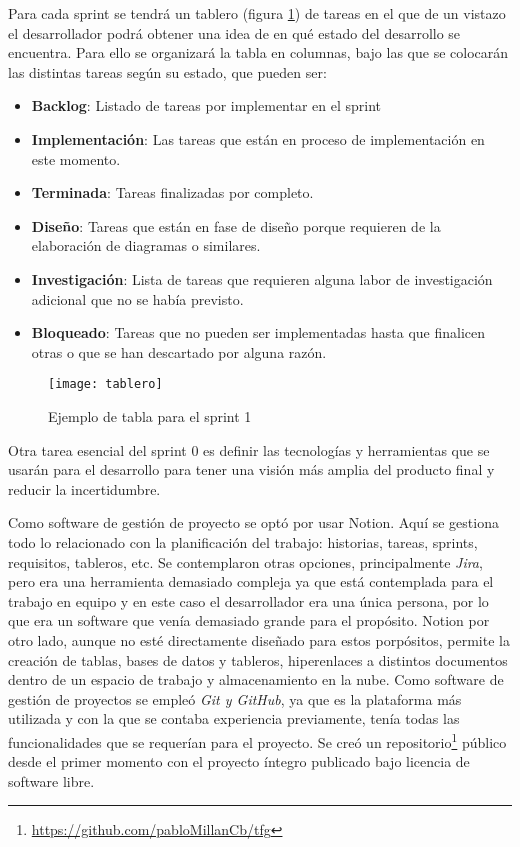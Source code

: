 Para cada sprint se tendrá un tablero (figura \ref{fig:tablero}) de tareas en el que de un vistazo el desarrollador podrá obtener una idea de en qué estado del desarrollo se encuentra. Para ello se organizará la tabla en columnas, bajo las que se colocarán las distintas tareas según su estado, que pueden ser:

\begin{itemize}
    \item \textbf{Backlog}: Listado de tareas por implementar en el sprint
    \item \textbf{Implementación}: Las tareas que están en proceso de implementación en este momento.
    \item \textbf{Terminada}: Tareas finalizadas por completo.
    \item \textbf{Diseño}: Tareas que están en fase de diseño porque requieren de la elaboración de diagramas o similares.
    \item \textbf{Investigación}: Lista de tareas que requieren alguna labor de investigación adicional que no se había previsto.
    \item \textbf{Bloqueado}: Tareas que no pueden ser implementadas hasta que finalicen otras o que se han descartado por alguna razón.
\end{itemize}

\begin{figure}[h]
    \centering
    \texttt{[image: tablero]}
    \caption[Tabla de sprint]{Ejemplo de tabla para el sprint 1}
	\label{fig:tablero}
\end{figure}

Otra tarea esencial del sprint 0 es definir las tecnologías y herramientas que se usarán para el desarrollo para tener una visión más amplia del producto final y reducir la incertidumbre.

Como software de gestión de proyecto se optó por usar Notion\cite{notion}. Aquí se gestiona todo lo relacionado con la planificación del trabajo: historias, tareas, sprints, requisitos, tableros, etc. Se contemplaron otras opciones, principalmente \textit{Jira}\cite{jira}, pero era una herramienta demasiado compleja ya que está contemplada para el trabajo en equipo y en este caso el desarrollador era una única persona, por lo que era un software que venía demasiado grande para el propósito. Notion por otro lado, aunque no esté directamente diseñado para estos porpósitos, permite la creación de tablas, bases de datos y tableros, hiperenlaces a distintos documentos dentro de un espacio de trabajo y almacenamiento en la nube. Como software de gestión de proyectos se empleó \textit{Git y GitHub}, ya que es la plataforma más utilizada y con la que se contaba experiencia previamente, tenía todas las funcionalidades que se requerían para el proyecto. Se creó un repositorio\footnote{\url{https://github.com/pabloMillanCb/tfg}} público desde el primer momento con el proyecto íntegro publicado bajo licencia de software libre.

